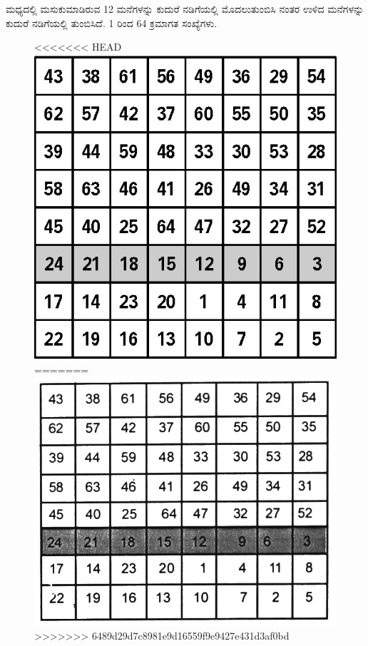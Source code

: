 \newpage

ಮಧ್ಯದಲ್ಲಿ ಮಸುಕುಮಾಡಿರುವ 12 ಮನೆಗಳನ್ನು ಕುದುರೆ ನಡಿಗೆಯಲ್ಲಿ ಮೊದಲು\break ತುಂಬಿಸಿ ನಂತರ ಉಳಿದ ಮನೆಗಳನ್ನು ಕುದುರೆ ನಡಿಗೆಯಲ್ಲಿ ತುಂಬಿಸಿದೆ. 1 ರಿಂದ 64 ಕ್ರಮಾ\-ಗತ ಸಂಖ್ಯೆಗಳು.
\begin{figure}[H]
<<<<<<< HEAD
\includegraphics{src/figures/chap6/fig6-15.eps}
=======
\includegraphics[scale=0.85]{src/figures/chap6/fig6.15.jpg}
>>>>>>> 6489d29d7c8981e9d16559f9e9427e431d3af0bd
\end{figure}
